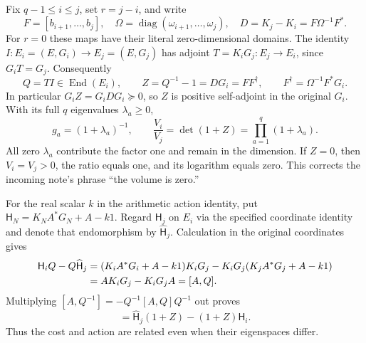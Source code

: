 Fix $q-1\le i\le j$, set $r=j-i$, and write
\begin{equation}
 F=[b_{i+1},\ldots,b_j],\quad
 \Omega=\operatorname{diag}(\omega_{i+1},\ldots,\omega_j),\quad
 D=K_j-K_i=F\Omega^{-1}F^*.\tag{RM.2}
\end{equation}
For $r=0$ these maps have their literal zero-dimensional domains.
The identity $I:E_i=(E,G_i)\to E_j=(E,G_j)$ has adjoint
$T=K_iG_j:E_j\to E_i$, since $G_iT=G_j$. Consequently
\begin{equation}
 Q=TI\in\operatorname{End}(E_i),\qquad
 Z=Q^{-1}-1=DG_i=FF^\dagger,\qquad F^\dagger=\Omega^{-1}F^*G_i.
 \tag{RM.3}
\end{equation}
In particular $G_iZ=G_iDG_i\succeq0$, so $Z$ is positive self-adjoint
in the original $G_i$. With its full $q$ eigenvalues $\lambda_a\ge0$,
\begin{equation}
 g_a=(1+\lambda_a)^{-1},\qquad
 \frac{V_i}{V_j}=\det(1+Z)=\prod_{a=1}^q(1+\lambda_a).
 \tag{RM.4}
\end{equation}
All zero $\lambda_a$ contribute the factor one and remain in the dimension.
If $Z=0$, then $V_i=V_j>0$, the ratio equals one, and its logarithm equals
zero. This corrects the incoming note's phrase ``the volume is zero.''

For the real scalar $k$ in the arithmetic action identity, put
$\mathsf H_N=K_NA^*G_N+A-k1$. Regard $\mathsf H_j$ on $E_i$ via the
specified coordinate identity and denote that endomorphism by
$\widehat{\mathsf H}_j$. Calculation in the original coordinates gives
\begin{align}
 \mathsf H_iQ-Q\widehat{\mathsf H}_j
 &=(K_iA^*G_i+A-k1)K_iG_j
   -K_iG_j(K_jA^*G_j+A-k1)\notag\\
 &=AK_iG_j-K_iG_jA=[A,Q].\notag
\end{align}
Multiplying $[A,Q^{-1}]=-Q^{-1}[A,Q]Q^{-1}$ out proves
\begin{equation}
 [A,Z]=\widehat{\mathsf H}_j(1+Z)-(1+Z)\mathsf H_i.\tag{RM.5}
\end{equation}
Thus the cost and action are related even when their eigenspaces differ.

